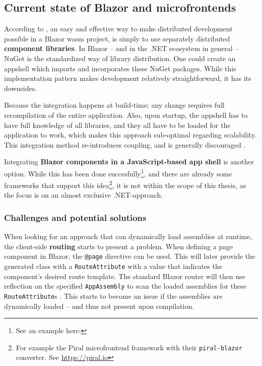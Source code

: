 \subsection{Current state of Blazor and microfrontends}

According to \textcite{Rappl_MunichNETMeetup_2020}, an easy and effective way to
make distributed development possible in a Blazor \gls{wasm} project, is simply
to use separately distributed \textbf{component libraries}. In Blazor -- and in
the .NET ecosystem in general -- NuGet is
the standardized way of library distribution. One could create an \gls{appshell}
which imports and incorporates these NuGet packages. While this implementation
pattern makes development relatively straightforward, it has its downsides.

Because the integration happens at build-time; any change requires full
recompilation of the entire application. Also, upon startup, the \gls{appshell}
has to have full knowledge of all libraries, and they all have to be loaded for
the application to work, which makes this approach sub-optimal regarding
scalability. This integration method re-introduces coupling, and is generally
discouraged \autocite{Jackson_2019}.

Integrating \textbf{Blazor components in a JavaScript-based app shell} is
another option. While this has been done succesfully\footnote{See an example
here: }, and
there are already some frameworks that support this idea\footnote{For example
the Piral microfrontend framework with their \texttt{piral-blazor} converter.
See \url{https://piral.io}}, it is not within the scope of this thesis, as the
focus is on an almost exclusive .NET-approach.

\subsubsection{Challenges and potential solutions}

When looking for an approach that can dynamically load assemblies at runtime,
the client-side \textbf{routing} starts to present a problem. When defining a
page component in Blazor, the \texttt{@page} directive can be used. This will
later provide the generated class with a \texttt{RouteAttribute} with a value
that indicates the component's desired route template. The standard Blazor
router will then use reflection on the specified \texttt{AppAssembly} to scan the
loaded assemblies for these \texttt{RouteAttribute}s \autocite{Sainty_2019}.
This starts to become an issue if the assemblies are dynamically loaded -- and
thus not present upon compilation. 

